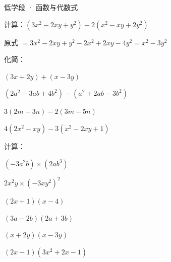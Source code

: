 \documentclass[a4paper,12pt]{ctexart}
\begin{document}
\pagestyle{empty}

\begin{center}
  \large 低学段 · 函数与代数式
\end{center}
\vspace{0.3cm}






\begin{example}
计算：$(3x^2-2xy+y^2)-2(x^2-xy+2y^2)$
\end{example}
\begin{solution}
原式 $=3x^2-2xy+y^2-2x^2+2xy-4y^2=x^2-3y^2$
\end{solution}




\begin{exercise}
\item 化简：
  \begin{subexercise}
    \item $(3x+2y)+(x-3y)$
    \item $(2a^2-3ab+4b^2)-(a^2+2ab-3b^2)$
    \item $3(2m-3n)-2(3m-5n)$
    \item $4(2x^2-xy)-3(x^2-2xy+1)$
  \end{subexercise}

\item 计算：
  \begin{subexercise}
    \item $(-3a^2b)\times(2ab^3)$
    \item $2x^2y\times(-3xy^2)^2$
    \item $(2x+1)(x-4)$
    \item $(3a-2b)(2a+3b)$
    \item $(x+2y)(x-3y)$
    \item $(2x-1)(3x^2+2x-1)$
  \end{subexercise}
\end{exercise}
\end{document}
